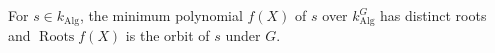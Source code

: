 For $s \in k_{\text{Alg}}$, the minimum polynomial $f(X)$ of $s$ over $k_{\text{Alg}}^G$ has distinct roots and $\operatorname{Roots} f(X)$ is the orbit of $s$ under $G$.
